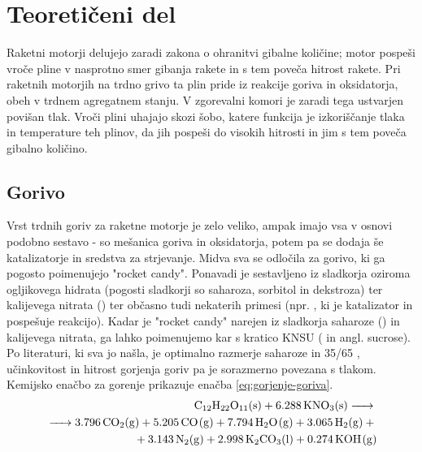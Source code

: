\documentclass[titlepage, a4paper, twoside, final, 12pt]{article}
\begin{document}
		\section{Teoretičeni del}
		Raketni motorji delujejo zaradi zakona o ohranitvi gibalne količine; motor pospeši vroče pline v nasprotno smer gibanja rakete in s tem poveča hitrost rakete.
		Pri raketnih motorjih na trdno grivo ta plin pride iz reakcije goriva in oksidatorja, obeh v trdnem agregatnem stanju. V zgorevalni komori je zaradi tega ustvarjen povišan tlak.
		Vroči plini uhajajo skozi šobo, katere funkcija je izkoriščanje tlaka in temperature teh plinov, da jih pospeši do visokih hitrosti in jim s tem poveča gibalno količino.

			\subsection{Gorivo}
			Vrst trdnih goriv za raketne motorje je zelo veliko, ampak imajo vsa v osnovi podobno sestavo - so mešanica goriva in oksidatorja, potem pa se dodaja še
			katalizatorje in sredstva za strjevanje. Midva sva se odločila za gorivo, ki ga pogosto poimenujejo "rocket candy".
			Ponavadi je sestavljeno iz sladkorja oziroma ogljikovega hidrata (pogosti sladkorji so saharoza, sorbitol in dekstroza) ter kalijevega nitrata () ter občasno
			tudi nekaterih primesi (npr. , ki je katalizator in pospešuje reakcijo).
			Kadar je "rocket candy" narejen iz sladkorja saharoze () in kalijevega nitrata, ga lahko poimenujemo kar s kratico KNSU ( in angl. sucrose).
			Po literaturi, ki sva jo našla, je optimalno razmerje saharoze in  35/65 \cite{nakkaKNSU2025}, učinkovitost in hitrost gorjenja goriv pa je sorazmerno povezana s tlakom.\cite{nakka_thrust}
			\\Kemijsko enačbo za gorenje prikazuje enačba \ref{eq:gorjenje-goriva}.\cite{nakkaKNSUchem2025}
			\begin{align} \label{eq:gorjenje-goriva}
			\begin{split} 
					\ce{C12H22O11(s) + 6.288 KNO3(s) ->\\ -> 3.796 CO2(g) + 5.205 CO(g) + 7.794 H2O(g) + 3.065 H2(g) +\\+ 3.143 N2(g) + 2.998 K2CO3(l) + 0.274 KOH(g)}
			\end{split}
			\end{align}
\end{document}
